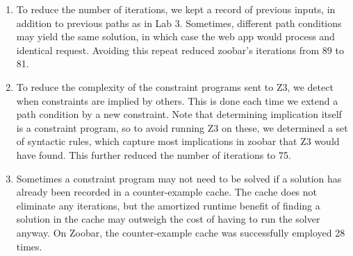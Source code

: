 \documentclass{scrartcl}
\begin{document}
\begin{enumerate}
\item To reduce the number of iterations, we kept a record of previous
  inputs, in addition to previous paths as in Lab 3. Sometimes,
  different path conditions may yield the same solution, in which case
  the web app would process and identical request. Avoiding this
  repeat reduced zoobar's iterations from 89 to 81.

\item To reduce the complexity of the constraint programs sent to Z3,
  we detect when constraints are implied by others. This is done each
  time we extend a path condition by a new constraint. Note that
  determining implication itself is a constraint program, so to avoid
  running Z3 on these, we determined a set of syntactic rules, which
  capture most implications in zoobar that Z3 would have found. This
  further reduced the number of iterations to 75.

\item Sometimes a constraint program may not need to be solved if a
  solution has already been recorded in a counter-example cache. The
  cache does not eliminate any iterations, but the amortized runtime
  benefit of finding a solution in the cache may outweigh the cost of
  having to run the solver anyway. On Zoobar, the counter-example
  cache was successfully employed 28 times.
\end{enumerate}
\end{document}
